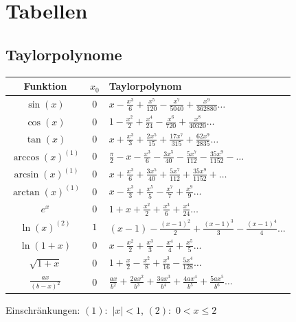\documentclass[a4paper,10pt]{article}
\begin{document}
    \vspace{4cm}
    
    \section{Tabellen}
    \renewcommand{\arraystretch}{1.5}
    
      \subsection{Taylorpolynome}
    \begin{center}
		\begin{tabularx}{\linewidth}{ccX}
			\toprule
			Funktion & $x_0$ & Taylorpolynom \\
  			\hline
			$\sin(x)$ & $0$ & $x - \frac{x^3}{6}+\frac{x^5}{120}-\frac{x^7}{5040}+\frac{x^9}{362880} \ldots$ \\
			$\cos(x)$ & $0$ & $1- \frac{x^2}{2}+\frac{x^4}{24}-\frac{x^6}{720}+\frac{x^8}{40320} \ldots$ \\
			$\tan(x)$ & $0$ & $x+\frac{x^3}{3}+\frac{2 x^5}{15}+\frac{17 x^7}{315}+\frac{62 x^9}{2835} \ldots$ \\
			$\arccos(x)^{(1)}$ & $0$ & $\frac{\pi}{2} - x - \frac{x^3}{6} - \frac{3x^5}{40} - \frac{5x^7}{112} - \frac{35x^9}{1152} - \ldots $ \\
			$\arcsin(x)^{(1)}$ & $0$ & $x + \frac{x^3}{6} + \frac{3x^5}{40} + \frac{5x^7}{112} + \frac{35x^9}{1152} + \ldots$ \\
			$\arctan(x)^{(1)}$ & $0$ & $x-\frac{x^3}{3}+\frac{x^5}{5}-\frac{x^7}{7}+\frac{x^9}{9} \ldots$ \\
			$e^{x}$ & $0$ & $1 + x + \frac{x^2}{2} + \frac{x^3}{6} + \frac{x^4}{24} \ldots$ \\
			$\ln(x)^{(2)}$ & $1$ & $(x\!-\!1) - \frac{(x\!-\!1)^2}{2} + \frac{(x\!-\!1)^3}{3} - \frac{(x\!-\!1)^4}{4}\ldots$ \\
			$\ln(1+x)$ & $0$ & $x- \frac{x^2}{2}+\frac{x^3}{3}-\frac{x^4}{4}+\frac{x^5}{5} \ldots$ \\
			$\sqrt{1+x}$ & $0$ & $1 + \frac{x}{2}-\frac{x^2}{8}+\frac{x^3}{16}-\frac{5x^4}{128} \ldots$ \\
			$\frac{ax}{(b-x)^2}$ & $0$ & $\frac{ax}{b^2}+\frac{2ax^2}{b^3}+\frac{3ax^3}{b^4}+\frac{4ax^4}{b^5}+\frac{5ax^5}{b^6} \ldots$ \\
			\bottomrule
		\end{tabularx}
		Einschränkungen: \hspace{1em} $(1)$:\ $|x|<1$, \hspace{1em}$(2)$:\ $0<x\leq 2$
	\end{center}
\end{document}
